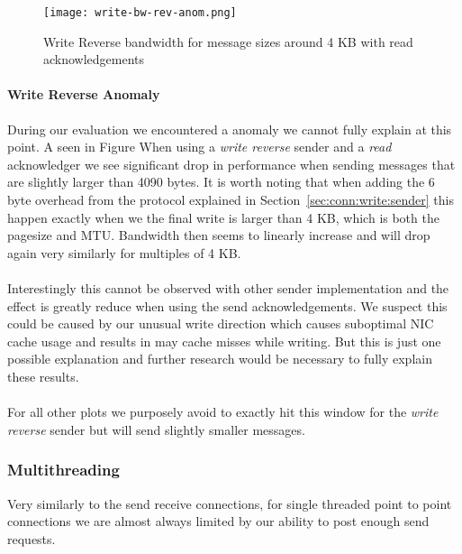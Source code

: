 \begin{figure}[h]
\texttt{[image: write-bw-rev-anom.png]}
\caption{Write Reverse bandwidth for message sizes around 4 KB with read acknowledgements}
\label{fig:plot-write-rev-anom}
\end{figure}

\paragraph{Write Reverse Anomaly} During our evaluation we encountered a anomaly we cannot fully explain at
this point. A seen in Figure  When using a \emph{write reverse} sender and a \emph{read} acknowledger we see 
significant drop in performance when sending messages that are slightly larger than 4090 bytes. It is worth 
noting that when adding the 6 byte overhead from the protocol explained in Section~\ref{sec:conn:write:sender}
this happen exactly when we the final write is larger than 4 KB, which is both the pagesize and MTU. Bandwidth
then seems to linearly increase and will drop again very similarly for multiples of 4 KB.

\paragraph{} Interestingly this cannot be observed with other sender implementation and the effect is greatly
reduce when using the send acknowledgements. We suspect this could be caused by our unusual write direction 
which causes suboptimal NIC cache usage and results in may cache misses while writing.
But this is just one  possible explanation and further research would be necessary to fully explain these
results.

\paragraph{} For all other plots we purposely avoid to exactly hit this window for the \emph{write reverse}
sender but will send slightly smaller messages.

\subsubsection{Multithreading}

Very similarly to the send receive connections, for single threaded point to point connections we are almost always limited 
by our ability to post enough send requests. 

